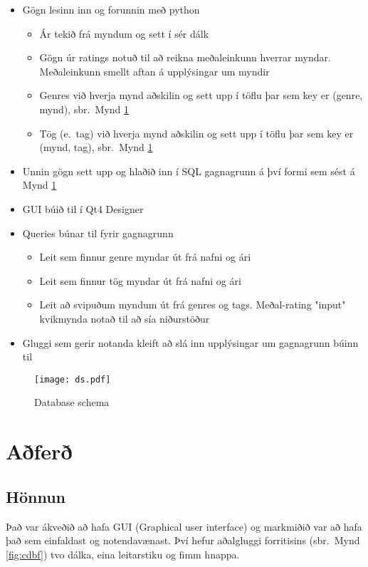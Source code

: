 \documentclass[12pt, git, final]{rureport}
\begin{document}
\begin{itemize}
	\item Gögn lesinn inn og forunnin með python
	\begin{itemize}
		\item Ár tekið frá myndum og sett í sér dálk
		\item Gögn úr ratings notuð til að reikna meðaleinkunn hverrar myndar. Meðaleinkunn smellt aftan á upplýsingar um myndir
		\item Genres við hverja mynd aðskilin og sett upp í töflu þar sem key er (genre, mynd), sbr.~Mynd \ref{fig:dataschema}
		\item Tög (e.~tag) við hverja mynd aðskilin og sett upp í töflu þar sem key er (mynd, tag), sbr.~Mynd \ref{fig:dataschema}
	\end{itemize}
	\item Unnin gögn sett upp og hlaðið inn í SQL gagnagrunn á því formi sem sést á Mynd \ref{fig:dataschema}
	\item GUI búið til í Qt4 Designer \cite{qt4}
	\item Queries búnar til fyrir gagnagrunn
	\begin{itemize}
		\item Leit sem finnur genre myndar út frá nafni og ári
		\item Leit sem finnur tög myndar út frá nafni og ári
		\item Leit að svipuðum myndum út frá genres og tags. Meðal-rating "input" kvikmynda notað til að sía niðurstöður
	\end{itemize}
	\item Gluggi sem gerir notanda kleift að slá inn upplýsingar um gagnagrunn búinn til
\end{itemize}

\begin{figure}
	\centering 
	\texttt{[image: ds.pdf]}
	\caption{Database schema \label{fig:dataschema}}
\end{figure} 

\section{Aðferð}\label{nidurstodur}
\subsection{Hönnun}
Það var ákveðið að hafa GUI (Graphical user interface) og markmiðið var að hafa það sem einfaldast og notendavænast. Því hefur aðalgluggi forritisins (sbr.~Mynd \ref{fig:cdbf}) tvo dálka, eina leitarstiku og fimm hnappa.
\end{document}
